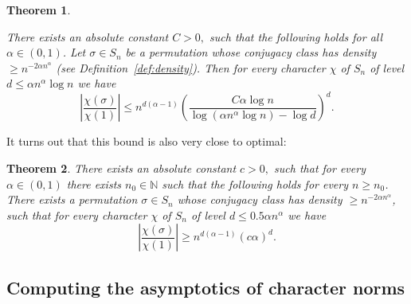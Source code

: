 \documentclass[11pt, letterpaper]{amsart}
\newtheorem{thm}{Theorem}[section]
\newcommand{\remove}[1]{}
\renewcommand\ge{\geqslant}
\renewcommand\le{\leqslant}
\newcommand{\NN}{\mathbb{N}}
\begin{document}
\begin{thm}\label{thm: actual upper bound on character ratio}
\remove{There exists an absolute constant $c>0,$ such that the following holds. Let $\alpha \in(0,1)$ and let 
$\sigma\in S_n$ be a permutation whose conjugacy class has density $\ge n^{-2c \alpha n^{\alpha}}$.
Then for every character $\chi$ of $S_n$ of level $d \le c \alpha n^{\alpha}\log n$ we have 
\[\left|\frac{\chi(\sigma)}{\chi(1)}\right| \le n^{d(\alpha-1)}\left(\frac{\alpha \log n}{\log(2c n^{\alpha}\log n) -\log d}\right)^d.\]}
There exists an absolute constant $C>0,$ such that the following holds for all $\alpha \in(0,1)$. Let 
$\sigma\in S_n$ be a permutation whose conjugacy class has density $\ge n^{-2 \alpha n^{\alpha}}$ (see Definition~\ref{def:density}).
Then for every character $\chi$ of $S_n$ of level $d \le \alpha n^{\alpha}\log n$ we have 
\[
\left| \frac{\chi(\sigma)}{\chi(1)}\right|\le  n^{d(\alpha -1)}\left(\frac{C \alpha \log n}{\log (\alpha n^{\alpha} \log n)-\log d}\right)^{d}.
\]
\end{thm}

It turns out that this bound is also very close to optimal:
\begin{thm}\label{thm: lower bound to actual upper bound on character ratio}
There exists an absolute constant $c>0,$ such that for every $\alpha \in(0,1)$ there exists $n_0 \in \NN$ such that the following holds for every $n \ge n_0$. There exists a permutation $\sigma\in S_n$ whose conjugacy class has density $\ge n^{-2 \alpha n^{\alpha}}$, such that for every character $\chi$ of $S_n$ of level $d \le 0.5\alpha n^{\alpha}$ we have 
\[
\left| \frac{\chi(\sigma)}{\chi(1)}\right|\ge  n^{d(\alpha -1)}(c\alpha)^{d}.
\]
\end{thm}



\subsection{Computing the asymptotics of character norms}
\end{document}
